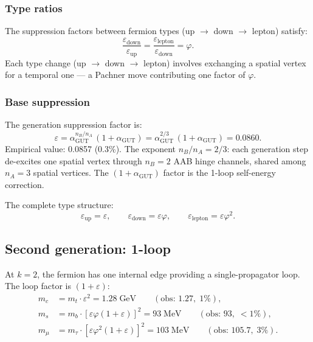 \documentclass[12pt]{article}
\theoremstyle{remark}
\theoremstyle{definition}
\begin{document}
\subsubsection{Type ratios}

The suppression factors between fermion types (up $\to$ down $\to$ lepton) satisfy:
\begin{equation}
\frac{\varepsilon_\text{down}}{\varepsilon_\text{up}} = \frac{\varepsilon_\text{lepton}}{\varepsilon_\text{down}} = \varphi.
\end{equation}
Each type change (up $\to$ down $\to$ lepton) involves exchanging a spatial vertex for a temporal one --- a Pachner move contributing one factor of $\varphi$.

\subsubsection{Base suppression}

The generation suppression factor is:
\begin{equation}
\varepsilon = \alpha_\text{GUT}^{n_B/n_A}\,(1 + \alpha_\text{GUT}) = \alpha_\text{GUT}^{2/3}\,(1 + \alpha_\text{GUT}) = 0.0860.
\end{equation}
Empirical value: 0.0857 (0.3\%). The exponent $n_B/n_A = 2/3$: each generation step de-excites one spatial vertex through $n_B = 2$ AAB hinge channels, shared among $n_A = 3$ spatial vertices. The $(1 + \alpha_\text{GUT})$ factor is the 1-loop self-energy correction.

The complete type structure:
\begin{equation}
\varepsilon_\text{up} = \varepsilon, \qquad \varepsilon_\text{down} = \varepsilon\varphi, \qquad \varepsilon_\text{lepton} = \varepsilon\varphi^2.
\end{equation}

\subsection{Second generation: 1-loop}

At $k = 2$, the fermion has one internal edge providing a single-propagator loop. The loop factor is $(1 + \varepsilon)$:
\begin{align}
m_c &= m_t \cdot \varepsilon^2 = 1.28\;\text{GeV} \qquad (\text{obs: } 1.27,\; 1\%), \\
m_s &= m_b \cdot [\varepsilon\varphi(1+\varepsilon)]^2 = 93\;\text{MeV} \qquad (\text{obs: } 93,\; <1\%), \\
m_\mu &= m_\tau \cdot [\varepsilon\varphi^2(1+\varepsilon)]^2 = 103\;\text{MeV} \qquad (\text{obs: } 105.7,\; 3\%).
\end{align}
\end{document}
